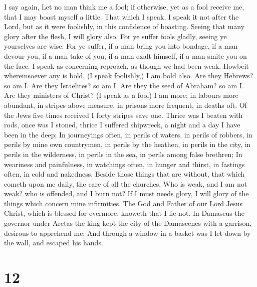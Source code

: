  I say again, Let no man think me a fool; if otherwise, yet
as a fool receive me, that I may boast myself a little. 
That which I speak, I speak it not after the Lord, but as it were
foolishly, in this confidence of boasting.  Seeing that
many glory after the flesh, I will glory also.  For ye
suffer fools gladly, seeing ye yourselves are wise.  For ye
suffer, if a man bring you into bondage, if a man devour you, if a man
take of you, if a man exalt himself, if a man smite you on the face.
 I speak as concerning reproach, as though we had been
weak. Howbeit whereinsoever any is bold, (I speak foolishly,) I am bold
also.  Are they Hebrews? so am I. Are they Israelites? so
am I. Are they the seed of Abraham? so am I.  Are they
ministers of Christ? (I speak as a fool) I am more; in labours more
abundant, in stripes above measure, in prisons more frequent, in deaths
oft.  Of the Jews five times received I forty stripes save
one.  Thrice was I beaten with rods, once was I stoned,
thrice I suffered shipwreck, a night and a day I have been in the deep;
 In journeyings often, in perils of waters, in perils of
robbers, in perils by mine own countrymen, in perils by the heathen, in
perils in the city, in perils in the wilderness, in perils in the sea,
in perils among false brethren;  In weariness and
painfulness, in watchings often, in hunger and thirst, in fastings
often, in cold and nakedness.  Beside those things that are
without, that which cometh upon me daily, the care of all the churches.
 Who is weak, and I am not weak? who is offended, and I
burn not?  If I must needs glory, I will glory of the
things which concern mine infirmities.  The God and Father
of our Lord Jesus Christ, which is blessed for evermore, knoweth that I
lie not.  In Damascus the governor under Aretas the king
kept the city of the Damascenes with a garrison, desirous to apprehend
me:  And through a window in a basket was I let down by the
wall, and escaped his hands.

\hypertarget{section-11}{%
\section{12}\label{section-11}}

